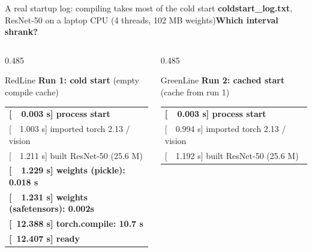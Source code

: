 \documentclass[aspectratio=169, 12pt]{beamer}
\begin{document}
\begin{frame}[t]{A real startup log: compiling takes most of the cold start}
  \vspace{-0.20cm}
  {\footnotesize\textbf{coldstart\_log.txt}, ResNet-50 on a laptop CPU (4 threads, 102 MB weights)\hfill\textbf{\textcolor{mlsysaccent}{Which interval shrank?}}}\par\vspace{0.06cm}
  \begin{columns}[T]
    \begin{column}{0.485\textwidth}
      \begin{mlsyscard}{RedLine}
        {\footnotesize\textbf{Run 1: cold start} \textcolor{midgray}{(empty compile cache)}}\par\vspace{0.03cm}
        {\fontsize{7.1}{9.0}\selectfont\ttfamily\renewcommand{\arraystretch}{0.95}
        \begin{tabular}{@{}l@{}}
          \textbf{[~~0.003 s] process start}\\
          \textcolor{midgray}{[~~1.003 s] imported torch 2.13 / vision}\\
          \textcolor{midgray}{[~~1.211 s] built ResNet-50 (25.6 M)}\\
          \textcolor{BlueLine}{\textbf{[~~1.229 s] weights (pickle): 0.018 s}}\\
          \textcolor{BlueLine}{\textbf{[~~1.231 s] weights (safetensors): 0.002s}}\\
          \textcolor{RedLine}{\textbf{[~12.388 s] torch.compile: 10.7 s}}\\
          \textbf{[~12.407 s] ready}
        \end{tabular}}
      \end{mlsyscard}
    \end{column}
    \begin{column}{0.485\textwidth}
      \begin{mlsyscard}{GreenLine}
        {\footnotesize\textbf{Run 2: cached start} \textcolor{midgray}{(cache from run 1)}}\par\vspace{0.03cm}
        {\fontsize{7.1}{9.0}\selectfont\ttfamily\renewcommand{\arraystretch}{0.95}
        \begin{tabular}{@{}l@{}}
          \textbf{[~~0.003 s] process start}\\
          \textcolor{midgray}{[~~0.994 s] imported torch 2.13 / vision}\\
          \textcolor{midgray}{[~~1.192 s] built ResNet-50 (25.6 M)}\\

\end{tabular}}
\end{mlsyscard}
\end{column}
\end{columns}
\end{frame}
\end{document}
